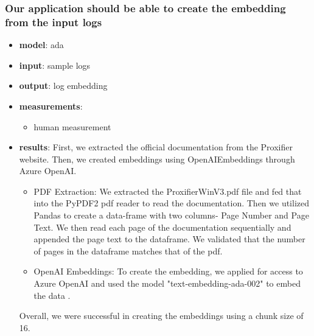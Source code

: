\documentclass[conference]{IEEEtran}
\begin{document}
\subsubsection{Our application should be able to create the embedding from the input logs}
\begin{itemize}
    \item \textbf{model}: ada
    \item \textbf{input}: sample logs
    \item \textbf{output}: log embedding
    \item \textbf{measurements}:
    \begin{itemize}
        \item human measurement
    \end{itemize}
    \item \textbf{results}: First, we extracted the official documentation from the Proxifier website. Then, we created embeddings using OpenAIEmbeddings through Azure OpenAI.
    \begin{itemize} 
    \item PDF Extraction: 
    We extracted the ProxifierWinV3.pdf file and fed that into the PyPDF2 pdf reader to read the documentation. Then we utilized Pandas to create a data-frame with two columns- Page Number and Page Text. We then read each page of the documentation sequentially and appended the page text to the dataframe. We validated that the number of pages in the dataframe matches that of the pdf.
    \item OpenAI Embeddings: 
    To create the embedding, we applied for access to Azure OpenAI and used the model "text-embedding-ada-002" to embed the data \cite{wang2023rethinking}. 
    \end{itemize}
    Overall, we were successful in creating the embeddings using a chunk size of 16.
\end{itemize}
\end{document}
